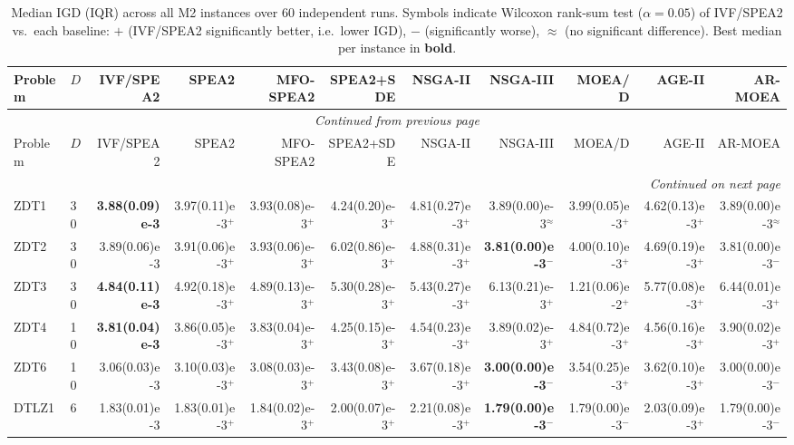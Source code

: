 \begin{longtable}{llrrrrrrrrr}
\caption{Median IGD (IQR) across all M2 instances over 60 independent runs. Symbols indicate Wilcoxon rank-sum test ($\alpha=0.05$) of IVF/SPEA2 vs.\ each baseline: $+$ (IVF/SPEA2 significantly better, i.e.\ lower IGD), $-$ (significantly worse), $\approx$ (no significant difference). Best median per instance in \textbf{bold}.}
\label{tab:igd_per_instance_m2}\\
\toprule
Problem & $D$ & IVF/SPEA2 & SPEA2 & MFO-SPEA2 & SPEA2+SDE & NSGA-II & NSGA-III & MOEA/D & AGE-II & AR-MOEA \\
\midrule
\endfirsthead
\multicolumn{11}{c}{{\textit{Continued from previous page}}} \\
\toprule
Problem & $D$ & IVF/SPEA2 & SPEA2 & MFO-SPEA2 & SPEA2+SDE & NSGA-II & NSGA-III & MOEA/D & AGE-II & AR-MOEA \\
\midrule
\endhead
\midrule
\multicolumn{11}{r}{{\textit{Continued on next page}}} \\
\endfoot
\botrule
\endlastfoot
ZDT1 & 30 & \textbf{3.88(0.09)e-3} & 3.97(0.11)e-3$^{+}$ & 3.93(0.08)e-3$^{+}$ & 4.24(0.20)e-3$^{+}$ & 4.81(0.27)e-3$^{+}$ & 3.89(0.00)e-3$^{\approx}$ & 3.99(0.05)e-3$^{+}$ & 4.62(0.13)e-3$^{+}$ & 3.89(0.00)e-3$^{\approx}$ \\
ZDT2 & 30 & 3.89(0.06)e-3 & 3.91(0.06)e-3$^{+}$ & 3.93(0.06)e-3$^{+}$ & 6.02(0.86)e-3$^{+}$ & 4.88(0.31)e-3$^{+}$ & \textbf{3.81(0.00)e-3}$^{-}$ & 4.00(0.10)e-3$^{+}$ & 4.69(0.19)e-3$^{+}$ & 3.81(0.00)e-3$^{-}$ \\
ZDT3 & 30 & \textbf{4.84(0.11)e-3} & 4.92(0.18)e-3$^{+}$ & 4.89(0.13)e-3$^{+}$ & 5.30(0.28)e-3$^{+}$ & 5.43(0.27)e-3$^{+}$ & 6.13(0.21)e-3$^{+}$ & 1.21(0.06)e-2$^{+}$ & 5.77(0.08)e-3$^{+}$ & 6.44(0.01)e-3$^{+}$ \\
ZDT4 & 10 & \textbf{3.81(0.04)e-3} & 3.86(0.05)e-3$^{+}$ & 3.83(0.04)e-3$^{+}$ & 4.25(0.15)e-3$^{+}$ & 4.54(0.23)e-3$^{+}$ & 3.89(0.02)e-3$^{+}$ & 4.84(0.72)e-3$^{+}$ & 4.56(0.16)e-3$^{+}$ & 3.90(0.02)e-3$^{+}$ \\
ZDT6 & 10 & 3.06(0.03)e-3 & 3.10(0.03)e-3$^{+}$ & 3.08(0.03)e-3$^{+}$ & 3.43(0.08)e-3$^{+}$ & 3.67(0.18)e-3$^{+}$ & \textbf{3.00(0.00)e-3}$^{-}$ & 3.54(0.25)e-3$^{+}$ & 3.62(0.10)e-3$^{+}$ & 3.00(0.00)e-3$^{-}$ \\
\midrule
DTLZ1 & 6 & 1.83(0.01)e-3 & 1.83(0.01)e-3$^{+}$ & 1.84(0.02)e-3$^{+}$ & 2.00(0.07)e-3$^{+}$ & 2.21(0.08)e-3$^{+}$ & \textbf{1.79(0.00)e-3}$^{-}$ & 1.79(0.00)e-3$^{-}$ & 2.03(0.09)e-3$^{+}$ & 1.79(0.00)e-3$^{-}$ \\

\end{longtable}
